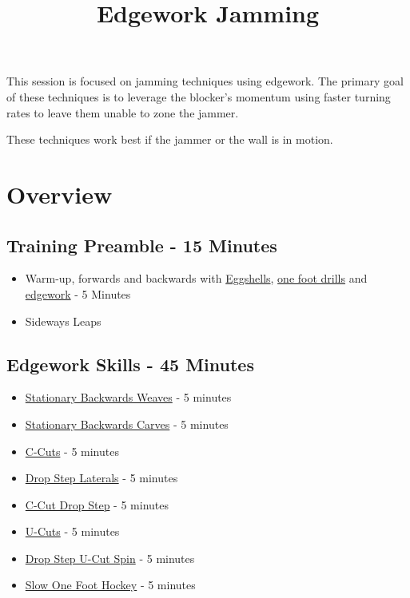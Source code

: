\documentclass{journal}
\title{Edgework Jamming}
\author{}
\begin{document}
\maketitle
\noindent 

This session is focused on jamming techniques using edgework.
The primary goal of these techniques is to leverage the blocker's momentum using faster turning rates to leave them unable to zone the jammer.     

These techniques work best if the jammer or the wall is in motion.


\section*{Overview}

\subsection*{Training Preamble - 15 Minutes}
\begin{itemize}
\item Warm-up, forwards and backwards with \hyperref[drill:sticky:eggshells]{Eggshells}, \hyperref[drill:one_foot:serpentine]{one foot drills} and  \hyperref[drill:carves_and_weaves]{edgework} - 5 Minutes
\item Sideways Leaps
\end{itemize}


\subsection*{Edgework Skills - 45 Minutes}
\begin{itemize}
    \item \hyperref[drill:edges:stationary_weaves]{Stationary Backwards Weaves} - 5 minutes
    \item \hyperref[drill:edges:stationary_carves]{Stationary Backwards Carves} - 5 minutes
    \item \hyperref[drill:edges:c_cut]{C-Cuts} - 5 minutes
    \item \hyperref[drill:edges:drop_step]{Drop Step Laterals} - 5 minutes
    \item \hyperref[drill:edges:c_cut_drop_step]{C-Cut Drop Step} - 5 minutes
    \item \hyperref[drill:edges:u_cut]{U-Cuts} - 5 minutes
    \item \hyperref[drill:edges:drop_step_u_cut]{Drop Step U-Cut Spin} - 5 minutes
    \item \hyperref[drill:edges:slow_one_foot_hockey]{Slow One Foot Hockey} - 5 minutes
\end{itemize}
\end{document}
